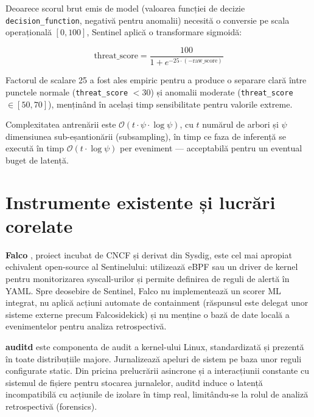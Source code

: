 \par Deoarece scorul brut emis de model (valoarea funcției de decizie \texttt{decision\_function}, negativă pentru anomalii) necesită o conversie pe scala operațională $[0, 100]$, Sentinel aplică o transformare sigmoidă:

\begin{equation}
    \text{threat\_score} = \frac{100}{1 + e^{-25 \cdot (-\text{raw\_score})}}
    \label{eq:sigmoid_transform}
\end{equation}

\par Factorul de scalare 25 a fost ales empiric pentru a produce o separare clară între punctele normale (\texttt{threat\_score} $< 30$) și anomalii moderate (\texttt{threat\_score} $\in [50, 70]$), menținând în același timp sensibilitate pentru valorile extreme.

\par Complexitatea antrenării este $\mathcal{O}(t \cdot \psi \cdot \log \psi)$, cu $t$ numărul de arbori și $\psi$ dimensiunea sub-eșantionării (subsampling), în timp ce faza de inferență se execută în timp $\mathcal{O}(t \cdot \log \psi)$ per eveniment --- acceptabilă pentru un eventual buget de latență.


\section{Instrumente existente și lucrări corelate}
\label{sec:related_work}

\par \textbf{Falco} \cite{FalcoProject}, proiect incubat de CNCF și derivat din Sysdig, este cel mai apropiat echivalent open-source al Sentinelului: utilizează eBPF sau un driver de kernel pentru monitorizarea syscall-urilor și permite definirea de reguli de alertă în YAML. Spre deosebire de Sentinel, Falco nu implementează un scorer ML integrat, nu aplică acțiuni automate de containment (răspunsul este delegat unor sisteme externe precum Falcosidekick) și nu menține o bază de date locală a evenimentelor pentru analiza retrospectivă.

\par \textbf{auditd} \cite{LinuxAudit} este componenta de audit a kernel-ului Linux, standardizată și prezentă în toate distribuțiile majore. Jurnalizează apeluri de sistem pe baza unor reguli configurate static. Din pricina prelucrării asincrone și a interacțiunii constante cu sistemul de fișiere pentru stocarea jurnalelor, auditd induce o latență incompatibilă cu acțiunile de izolare în timp real, limitându-se la rolul de analiză retrospectivă (forensics).

